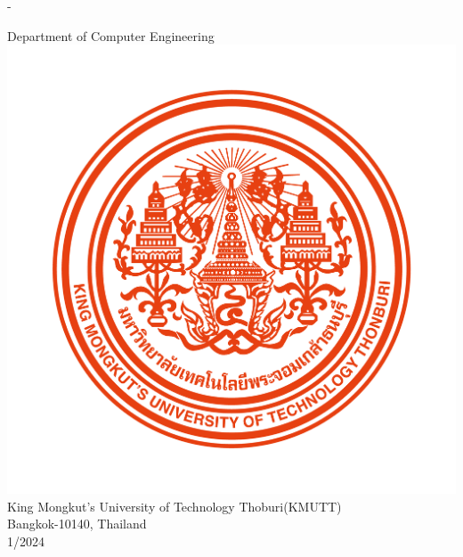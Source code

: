 \begin{titlingpage}
\begin{SingleSpace}
\begin{adjustwidth*}{\unitlength}{-\unitlength}
\begin{center}
				{\large {Department of Computer Engineering}}\\
				\vspace{12mm}
				\includegraphics[scale=0.3]{frontmatter/KMUTT_CI.png} \\[0.25cm]
				\vspace{5mm}
				{\large King Mongkut's University of Technology Thoburi(KMUTT)}\\
				{\large Bangkok-10140, Thailand}\\
				{\large 1/2024}\\
			\end{center}
		\end{adjustwidth*}
	\end{SingleSpace}
\end{titlingpage}